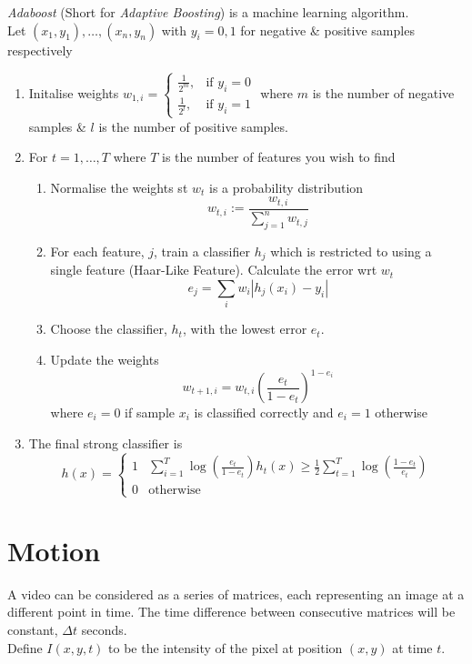 \documentclass[11pt,a4paper]{article}
\begin{document}
\textit{Adaboost} (Short for \textit{Adaptive Boosting}) is a machine learning algorithm.\\
Let $(x_1,y_1),\dots,(x_n,y_n)$ with $y_i=0,1$ for negative \& positive samples respectively
\begin{enumerate}[label=\roman*)]
	\item Initalise weights $w_{1,i}=\begin{cases}\frac{1}{2^m},&\text{if }y_i=0\\\frac{1}{2^l},&\text{if }y_i=1\end{cases}$ where $m$ is the number of negative samples \& $l$ is the number of positive samples.
	\item For $t=1,\dots,T$ where $T$ is the number of features you wish to find
	\begin{enumerate}
		\item Normalise the weights st $w_t$ is a probability distribution
		$$w_{t,i}:=\frac{w_{t,i}}{\sum_{j=1}^nw_{t,j}}$$
		\item For each feature, $j$, train a classifier $h_j$ which is restricted to using a single feature (Haar-Like Feature). Calculate the error wrt $w_t$
		$$e_j=\sum_iw_i|h_j(x_i)-y_i|$$
		\item Choose the classifier, $h_t$, with the lowest error $e_t$.
		\item Update the weights
		$$w_{t+1,i}=w_{t,i}\left(\frac{e_t}{1-e_t}\right)^{1-e_i}$$
		where $e_i=0$ if sample $x_i$ is classified correctly and $e_i=1$ otherwise
	\end{enumerate}
	\item The final strong classifier is
	$$h(x)=\begin{cases}1&\sum_{i=1}^T\log\left(\frac{e_t}{1-e_t}\right)h_t(x)\geq\frac{1}{2}\sum_{t=1}^T\log\left(\frac{1-e_t}{e_t}\right)\\0&\text{otherwise}\end{cases}$$
\end{enumerate}

\section{Motion}

A video can be considered as a series of matrices, each representing an image at a different point in time. The time difference between consecutive matrices will be constant, $\Delta t$ seconds.\\
Define $I(x,y,t)$ to be the intensity of the pixel at position $(x,y)$ at time $t$.\\
\end{document}
